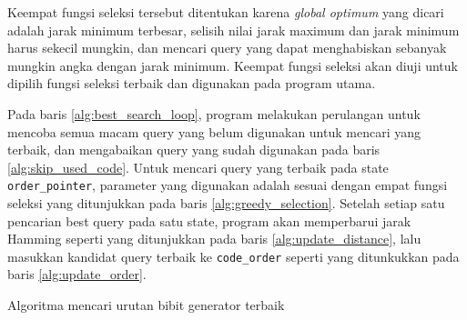 Keempat fungsi seleksi tersebut ditentukan karena \textit{global optimum} yang dicari adalah jarak minimum terbesar, selisih nilai jarak maximum dan jarak minimum harus sekecil mungkin, dan mencari query yang dapat menghabiskan sebanyak mungkin angka dengan jarak minimum. Keempat fungsi seleksi  akan diuji untuk dipilih fungsi seleksi terbaik dan digunakan pada program utama. 

Pada baris \ref{alg:best_search_loop}, program melakukan perulangan untuk mencoba semua macam query yang belum digunakan untuk mencari yang terbaik, dan mengabaikan query yang sudah digunakan pada baris \ref{alg:skip_used_code}. Untuk mencari query yang terbaik pada state \texttt{order\_pointer}, parameter yang digunakan adalah sesuai dengan empat fungsi seleksi yang ditunjukkan pada baris \ref{alg:greedy_selection}. Setelah setiap satu pencarian best query pada satu state, program akan memperbarui jarak Hamming seperti yang ditunjukkan pada baris \ref{alg:update_distance}, lalu masukkan kandidat query terbaik ke \texttt{code\_order} seperti yang ditunkukkan pada baris \ref{alg:update_order}.

\begin{algorithm}[h]
\caption{Algoritma mencari urutan bibit generator terbaik}
\label{alg:exhaustive_search}
\end{algorithm}

